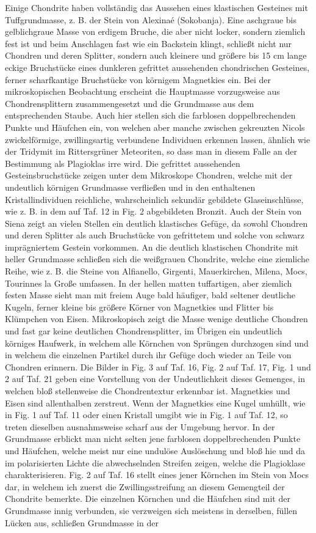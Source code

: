 \documentclass[a4paper, 12pt, oneside]{article}
\begin{document}
Einige Chondrite haben vollständig das Aussehen eines klastischen Gesteines mit Tuffgrundmasse, z. B. der Stein von Alexinaé (Sokobanja). Eine aschgraue bis gelblichgraue Masse von erdigem Bruche, die aber nicht locker, sondern ziemlich fest ist und beim Anschlagen fast wie ein Backstein klingt, schließt nicht nur Chondren und deren Splitter, sondern auch kleinere und größere bis 15 cm lange eckige Bruchstücke eines dunkleren gefrittet aussehenden chondrischen Gesteines, ferner scharfkantige Bruchstücke von körnigem Magnetkies ein. Bei der mikroskopischen Beobachtung erscheint die Hauptmasse vorzugsweise aus Chondrensplittern zusammengesetzt und die Grundmasse aus dem entsprechenden Staube. Auch hier stellen sich die farblosen doppelbrechenden Punkte und Häufchen ein, von welchen aber manche zwischen gekreuzten Nicols zwickelförmige, zwillingsartig verbundene Individuen erkennen lassen, ähnlich wie der Tridymit im Rittersgrüner Meteoriten, so dass man in diesem Falle an der Bestimmung als Plagioklas irre wird. Die gefrittet aussehenden Gesteinsbruchstücke zeigen unter dem Mikroskope Chondren, welche mit der undeutlich körnigen Grundmasse verfließen und in den enthaltenen Kristallindividuen reichliche, wahrscheinlich sekundär gebildete Glaseinschlüsse, wie z. B. in dem auf Taf. 12 in Fig. 2 abgebildeten Bronzit. Auch der Stein von Siena zeigt an vielen Stellen ein deutlich klastisches Gefüge, da sowohl Chondren und deren Splitter als auch Bruchstücke von gefrittetem und solche von schwarz imprägniertem Gestein vorkommen. An die deutlich klastischen Chondrite mit heller Grundmasse schließen sich die weißgrauen Chondrite, welche eine ziemliche Reihe, wie z. B. die Steine von Alfianello, Girgenti, Mauerkirchen, Milena, Mocs, Tourinnes la Große umfassen. In der hellen matten tuffartigen, aber ziemlich festen Masse sieht man mit freiem Auge bald häufiger, bald seltener deutliche Kugeln, ferner kleine bis größere Körner von Magnetkies und Flitter bis Klümpchen von Eisen. Mikroskopisch zeigt die Masse wenige deutliche Chondren und fast gar keine deutlichen Chondrensplitter, im Übrigen ein undeutlich körniges Haufwerk, in welchem alle Körnchen von Sprüngen durchzogen sind und in welchem die einzelnen Partikel durch ihr Gefüge doch wieder an Teile von Chondren erinnern. Die Bilder in Fig. 3 auf Taf. 16, Fig. 2 auf Taf. 17, Fig. 1 und 2 auf Taf. 21 geben eine Vorstellung von der Undeutlichkeit dieses Gemenges, in welchen bloß stellenweise die Chondrentextur erkennbar ist. Magnetkies und Eisen sind allenthalben zerstreut. Wenn der Magnetkies eine Kugel umhüllt, wie in Fig. 1 auf Taf. 11 oder einen Kristall umgibt wie in Fig. 1 auf Taf. 12, so treten dieselben ausnahmsweise scharf aus der Umgebung hervor. In der Grundmasse erblickt man nicht selten jene farblosen doppelbrechenden Punkte und Häufchen, welche meist nur eine undulöse Auslöschung und bloß hie und da im polarisierten Lichte die abwechselnden Streifen zeigen, welche die Plagioklase charakterisieren. Fig. 2 auf Taf. 16 stellt eines jener Körnchen im Stein von Mocs dar, in welchem ich zuerst die Zwillingsstreifung an diesem Gemengteil der Chondrite bemerkte. Die einzelnen Körnchen und die Häufchen sind mit der Grundmasse innig verbunden, sie verzweigen sich meistens in derselben, füllen Lücken aus, schließen Grundmasse in der 
\end{document}

